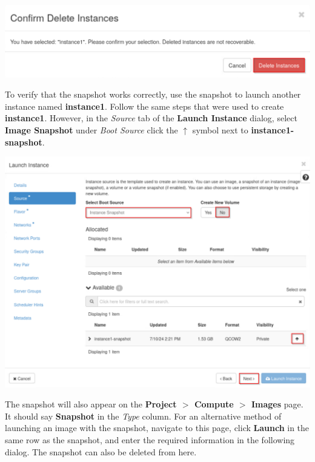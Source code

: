 \documentclass[letterpaper, 12pt]{article}
\begin{document}
\begin{enumerate}
\begin{labstep}
        \begin{center}
            \includegraphics[width=\linewidth]{images/part1/step16.png}
        \end{center}
    \end{labstep}

    \begin{labstep}
        To verify that the snapshot works correctly, use the snapshot to launch another instance named \textbf{instance1}.
        Follow the same steps that were used to create \textbf{instance1}.
        However, in the \textit{Source} tab of the \textbf{Launch Instance} dialog, select \textbf{Image Snapshot} under \textit{Boot Source} click the $\uparrow$ symbol next to \textbf{instance1-snapshot}.

        \begin{center}
            \includegraphics[width=\linewidth]{images/part1/step17.png}
        \end{center}
    \end{labstep}

    \begin{tipbox}
        The snapshot will also appear on the \textbf{Project $>$ Compute $>$ Images} page.
        It should say \textbf{Snapshot} in the \textit{Type} column.
        For an alternative method of launching an image with the snapshot, navigate to this page, click \textbf{Launch} in the same row as the snapshot, and enter the required information in the following dialog.
        The snapshot can also be deleted from here.
    \end{tipbox}


\end{enumerate}
\end{document}
